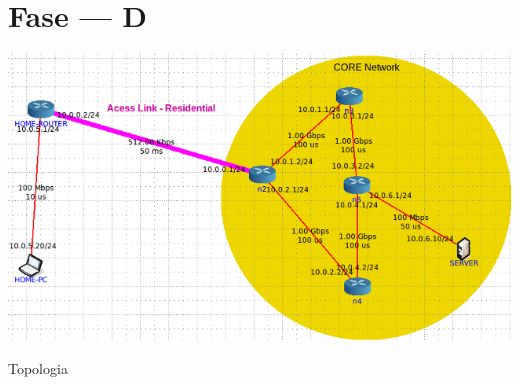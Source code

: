 \section{Fase --- D}

\begin{center}
 	
 	\includegraphics[width=\textwidth,height=\textheight,keepaspectratio]{resources/images/Alinea1/topologia.png}
 	\captionsetup{type=figure, width=0.8\linewidth}
	\caption{Topologia}
\label{fig:ssec1:topologia} 
\end{center}






